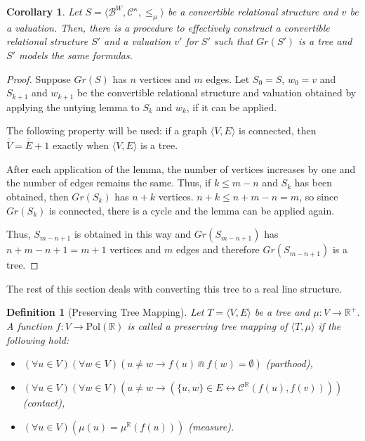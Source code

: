 \documentclass{article}
\newtheorem*{definition}{Definition}
\newtheorem*{corollary}{Corollary}
\newcommand{\card}[1]{\overline{\overline{#1}}}
\newcommand{\R}{\mathbb{R}}
\newcommand{\B}{\mathcal{B}}
\newcommand{\bcap}{\Cap}
\newcommand{\bcont}{\mathcal{C}^\R}
\newcommand{\Pol}{\text{Pol}}
\begin{document}
\begin{corollary}
  Let $S = \langle \B^W, \mathcal{C}^\kappa, \leq_\mu \rangle$ be a convertible relational structure and $v$ be a valuation.
  Then, there is a procedure to effectively construct a convertible relational structure $S'$ and a valuation $v'$ for $S'$ such that $Gr(S')$ is a tree and $S'$ models the same formulas.
\end{corollary}
\begin{proof}
  Suppose $Gr(S)$ has $n$ vertices and $m$ edges. Let $S_0 = S$, $w_0 = v$ and $S_{k+1}$ and $w_{k+1}$ be the convertible relational structure and valuation obtained by applying the untying lemma to $S_k$ and $w_k$, if it can be applied.

  The following property will be used: if a graph $\langle V, E \rangle$ is connected, then $\card{V} = \card{E} + 1$ exactly when $\langle V, E \rangle$ is a tree.

  After each application of the lemma, the number of vertices increases by one and the number of edges remains the same. Thus, if $k \leq m - n$ and $S_k$ has been obtained, then $Gr(S_k)$ has $n + k$ vertices. $n+k \leq n + m - n = m$, so since $Gr(S_k)$ is connected, there is a cycle and the lemma can be applied again.

  Thus, $S_{m - n + 1}$ is obtained in this way and $Gr(S_{m - n + 1})$ has $n + m - n + 1 = m + 1$ vertices and $m$ edges and therefore $Gr(S_{m - n + 1})$ is a tree.
\end{proof}

The rest of this section deals with converting this tree to a real line structure.

\begin{definition}[Preserving Tree Mapping]
  Let $T = \langle V, E \rangle$ be a tree and $\mu : V \rightarrow \R^+$.
  A function $f : V \rightarrow \Pol(\R)$ is called a \emph{preserving tree mapping} of $\langle T, \mu \rangle$ if the following hold:
  \begin{itemize}
  \item $(\forall u \in V)(\forall w \in V)(u \neq w \rightarrow f(u) \bcap f(w) = \emptyset)$ (parthood),
  \item $(\forall u \in V)(\forall w \in V)(u \neq w \rightarrow (\{u, w\} \in E \leftrightarrow \bcont(f(u), f(v))))$ (contact),
  \item $(\forall u \in V)(\mu(u) = \mu^\R(f(u)))$ (measure).
  \end{itemize}
\end{definition}
\end{document}
